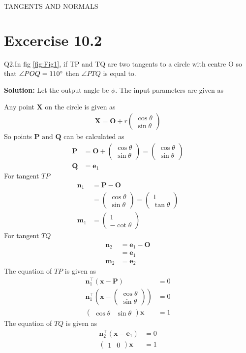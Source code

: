 \documentclass[12pt]{article}
\providecommand{\brak}[1]{\ensuremath{\left(#1\right)}}
\newcommand{\solution}{\noindent \textbf{Solution: }}
\newcommand{\myvec}[1]{\ensuremath{\begin{pmatrix}#1\end{pmatrix}}}
\let\vec\mathbf
\begin{document}
\begin{center}
\textbf\large{TANGENTS AND NORMALS}

\end{center}
\section*{Excercise 10.2}
Q2.In fig \ref{fig:Fig1}, if TP and TQ are two tangents to a circle with centre O so that $\angle{POQ} = 110\degree$ then $\angle{PTQ}$ is equal to.

\solution
Let the output angle be $\phi$.
The input parameters are given as

Any point $\vec{X}$ on the circle is given as
\begin{align}
	\vec{X} = \vec{O}+r\myvec{\cos\theta\\\sin\theta}
\end{align}
So points $\vec{P} \text{ and } \vec{Q}$ can be calculated as
\begin{align}
	\vec{P} &= \vec{O}+\myvec{\cos\theta\\\sin\theta} = \myvec{\cos\theta\\\sin\theta}\\
	\vec{Q} &= \vec{e}_1
\end{align}
For tangent $TP$
\begin{align}
	\vec{n}_1 &= \vec{P}-\vec{O}\\
	&= \myvec{\cos\theta\\\sin\theta} =  \myvec{1\\\tan\theta}\\
	\vec{m}_1 &= \myvec{1\\-\cot\theta}
\end{align}
For tangent $TQ$
\begin{align}
	\vec{n}_2 &= \vec{e}_1-\vec{O}\\
	&= \vec{e}_1\\
	\vec{m}_2 &= \vec{e}_2
\end{align}
The equation of $TP$ is given as
\begin{align}
	\vec{n}_1^\top\brak{\vec{x}-\vec{P}} &= 0\\
	\vec{n}_1^\top\brak{\vec{x}-\myvec{\cos\theta\\\sin\theta}} &= 0\\
	\label{eq:eq1}
	\myvec{\cos\theta & \sin\theta}\vec{x} &= 1
\end{align}
The equation of $TQ$ is given as
\begin{align}
	\vec{n}_2^\top\brak{\vec{x}-\vec{e}_1} &= 0\\
	\label{eq:eq2}
	\myvec{1&0}\vec{x} &= 1
\end{align}
\end{document}
